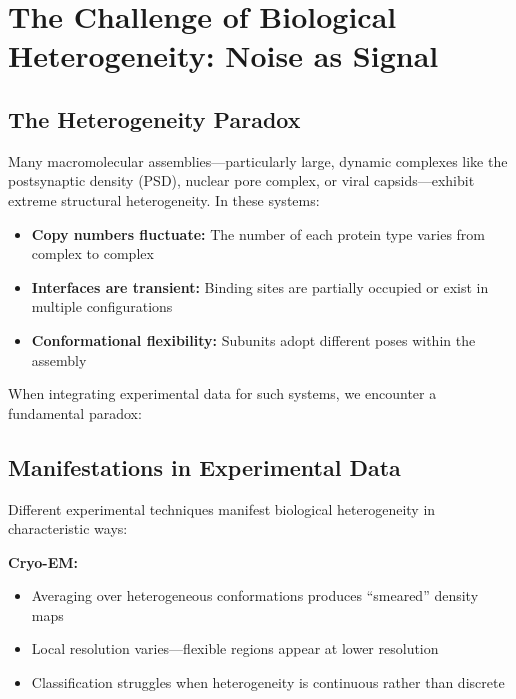 \documentclass[11pt,a4paper]{article}
\theoremstyle{definition}
\begin{document}
\section{The Challenge of Biological Heterogeneity: Noise as Signal}

\subsection{The Heterogeneity Paradox}

Many macromolecular assemblies---particularly large, dynamic complexes like the postsynaptic density (PSD), nuclear pore complex, or viral capsids---exhibit extreme structural heterogeneity. In these systems:

\begin{itemize}
    \item \textbf{Copy numbers fluctuate:} The number of each protein type varies from complex to complex
    \item \textbf{Interfaces are transient:} Binding sites are partially occupied or exist in multiple configurations
    \item \textbf{Conformational flexibility:} Subunits adopt different poses within the assembly
\end{itemize}

When integrating experimental data for such systems, we encounter a fundamental paradox:

\begin{center}
\end{center}

\subsection{Manifestations in Experimental Data}

Different experimental techniques manifest biological heterogeneity in characteristic ways:

\textbf{Cryo-EM:}
\begin{itemize}
    \item Averaging over heterogeneous conformations produces ``smeared'' density maps
    \item Local resolution varies---flexible regions appear at lower resolution
    \item Classification struggles when heterogeneity is continuous rather than discrete
\end{itemize}
\end{document}
